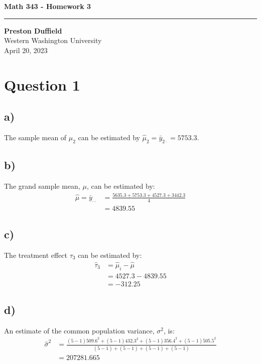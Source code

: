 \documentclass{article}
\begin{document}
\noindent
\begin{minipage}[t]{0.6\textwidth}
    \begin{flushleft}
        \LARGE\textbf{Math 343 - Homework 3} \\
        \vspace{6pt} %
        \hrule width 10cm
        \vspace{12pt}
        \large\textbf{Preston Duffield} \\
        \large Western Washington University \\
        April 20, 2023
        \vspace{24pt}
    \end{flushleft}
\end{minipage}

\section*{Question 1}
\subsection*{a)}
The sample mean of $\mu_2$ can be estimated by $\hat{\mu}_2 = \bar{y}_{2 \cdot} = 5753.3$.
\subsection*{b)}
The grand sample mean, $\mu$, can be estimated by:
\begin{align*}
  \hat{\mu} = \bar{y}_{\cdot \cdot} & = \frac{5635.3+5753.3+4527.3+3442.3}{4} \\
  & = 4839.55
\end{align*}
\subsection*{c)}
The treatment effect $\tau_3$ can be estimated by:
\begin{align*}
  \hat{\tau}_3 & = \hat{\mu}_i - \hat{\mu} \\
  & = 4527.3 - 4839.55 \\
  & = -312.25
\end{align*}
\subsection*{d)}
An estimate of the common population variance, $\sigma^2$, is:
\begin{align*}
  \hat{\sigma}^2 & = \frac{(5-1)509.6^2 + (5-1)432.3^2 + (5-1)356.4^2 + (5-1)505.5^2}
  {(5-1)+(5-1)+(5-1)+(5-1)} \\
  & = 207281.665 
\end{align*}
\end{document}

